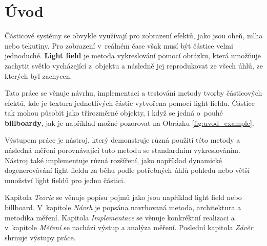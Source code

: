 

\setcounter{tocdepth}{1} 


\chapter{Úvod}
Částicové systémy se obvykle využívají pro zobrazení efektů, jako jsou oheň, mlha nebo tekutiny. Pro zobrazení v~reálném čase však musí být částice velmi jednoduché. \textbf{Light field} je metoda vykreslování pomocí obrázku, která umožňuje zachytit světlo vycházející z~objektu a následně jej reprodukovat ze všech úhlů, ze kterých byl zachycen.   

Tato práce se věnuje návrhu, implementaci a testování metody tvorby částicových efektů, kde je textura jednotlivých částic vytvořena pomocí light fieldu. Částice tak mohou působit jako třírozměrné objekty, i když se jedná o~pouhé \textbf{billboardy}, jak je například možné pozorovat na Obrázku \ref{fig:uvod_example}.

Výstupem práce je nástroj, který demonstruje různá použití této metody a následná měření porovnávající tuto metodu se standardním vykreslováním. Nástroj také implementuje různá rozšíření, jako například dynamické dogenerovávání light fieldu za běhu podle potřebných úhlů pohledu nebo větší množství light fieldů pro jednu částici.

Kapitola \emph{Teorie} se věnuje popisu pojmů jako jsou například light field nebo billboard. V~kapitole \emph{Návrh} je popsána navrhovaná metoda, architektura a metodika měření. Kapitola \emph{Implementace} se věnuje konkréktní realizaci a v~kapitole \emph{Měření} se nachází výstup a analýza měření. Poslední kapitola \emph{Závěr} shrnuje výstupy práce. 

